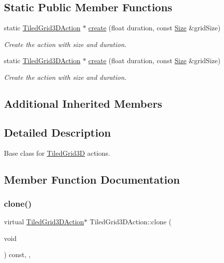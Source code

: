 \subsection*{Static Public Member Functions}
\begin{DoxyCompactItemize}
\item 
static \hyperlink{classTiledGrid3DAction}{Tiled\+Grid3\+D\+Action} $\ast$ \hyperlink{classTiledGrid3DAction_a25c94bed88c9770550409009b911d0d7}{create} (float duration, const \hyperlink{classSize}{Size} \&grid\+Size)
\begin{DoxyCompactList}\small\item\em Create the action with size and duration. \end{DoxyCompactList}\item 
static \hyperlink{classTiledGrid3DAction}{Tiled\+Grid3\+D\+Action} $\ast$ \hyperlink{classTiledGrid3DAction_a25c94bed88c9770550409009b911d0d7}{create} (float duration, const \hyperlink{classSize}{Size} \&grid\+Size)
\begin{DoxyCompactList}\small\item\em Create the action with size and duration. \end{DoxyCompactList}\end{DoxyCompactItemize}
\subsection*{Additional Inherited Members}


\subsection{Detailed Description}
Base class for \hyperlink{classTiledGrid3D}{Tiled\+Grid3D} actions. 

\subsection{Member Function Documentation}
\mbox{\label{classTiledGrid3DAction_a689fd377cc0abae91db7def106529b53}} 
\subsubsection{\texorpdfstring{clone()}{clone()}\hspace{0.1cm}{\footnotesize\ttfamily [1/2]}}
{\footnotesize\ttfamily virtual \hyperlink{classTiledGrid3DAction}{Tiled\+Grid3\+D\+Action}$\ast$ Tiled\+Grid3\+D\+Action\+::clone (\begin{DoxyParamCaption}\item[{void}]{ }\end{DoxyParamCaption}) const\hspace{0.3cm}{\ttfamily [inline]}, {\ttfamily [override]}, {\ttfamily [virtual]}}

